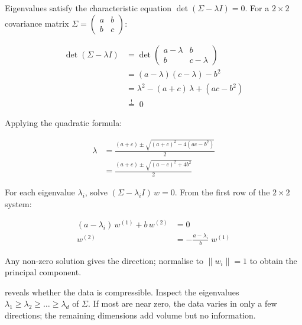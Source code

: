Eigenvalues satisfy the characteristic equation $\det(\Sigma - \lambda I) = 0$.%
For a $2{\times}2$ covariance matrix
$\Sigma = \begin{pmatrix} a & b \\ b & c \end{pmatrix}$:

\begin{align*}
    \det(\Sigma - \lambda I)
        &= \det\begin{pmatrix} a - \lambda & b \\ b & c - \lambda \end{pmatrix} \\
        &= (a - \lambda)(c - \lambda) - b^2 \\
        &= \lambda^2 - (a + c)\,\lambda + (ac - b^2) \\
        &\stackrel{!}{=}\; 0
\end{align*}

Applying the quadratic formula:

\begin{align*}
    \lambda
        &= \frac{(a + c) \pm \sqrt{(a + c)^2 - 4(ac - b^2)}}{2} \\[4pt]
        &= \frac{(a + c) \pm \sqrt{(a - c)^2 + 4b^2}}{2}
\end{align*}

For each eigenvalue $\lambda_i$, solve $(\Sigma - \lambda_i I)\, w = 0$.
From the first row of the $2{\times}2$ system:

\begin{align*}
    (a - \lambda_i)\, w^{(1)} + b\, w^{(2)} &= 0 \\[4pt]
    w^{(2)} &= -\frac{a - \lambda_i}{b}\; w^{(1)}
\end{align*}

Any non-zero solution gives the direction; normalise to $\|w_i\|{=}1$ to obtain the principal component.


 reveals whether the data is compressible.
Inspect the eigenvalues $\lambda_1 \geq \lambda_2 \geq \ldots \geq \lambda_d$ of $\Sigma$.
If most are near zero, the data varies in only a few directions; the remaining dimensions
add volume but no information.


